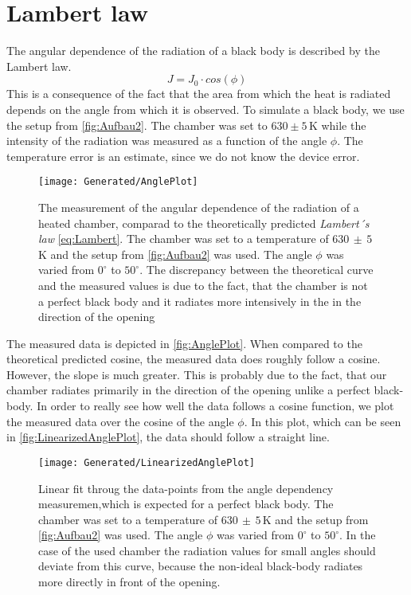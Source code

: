 \documentclass[a4paper,10pt,twocolumn]{article}
\begin{document}
    \section{Lambert law}\label{sec:lambertLaw}
    The angular dependence of the radiation of a black body is described by the Lambert law.
    \begin{equation}\label{eq:Lambert}
        J = J_0 \cdot cos(\phi)
    \end{equation}
    This is a consequence of the fact that the area from which the heat is radiated depends on the angle from which it is observed.
    To simulate a black body, we use the setup from \autoref{fig:Aufbau2}.
    The chamber was set to $630 \pm 5\,$K while the intensity of the radiation was measured as a function of the angle $\phi$.
    The temperature error is an estimate, since we do not know the device error.
    \begin{figure}
        \begin{center}
            \texttt{[image: Generated/AnglePlot]}
            \caption{The measurement of the angular dependence of the radiation of a heated chamber, comparad to the theoretically predicted \textit{Lambert´s law} \autoref{eq:Lambert}.
            The chamber was set to a temperature of $630\, \pm \,5\,$K and the setup from \autoref{fig:Aufbau2} was used.
            The angle $\phi$ was varied from $0^\circ$ to $50^\circ $.
            The discrepancy between the theoretical curve and the measured values is due to the fact, that the chamber is not a perfect black body and it radiates more intensively in the in the direction of the opening}
            \label{fig:AnglePlot}
        \end{center}
    \end{figure}
    The measured data is depicted in \autoref{fig:AnglePlot}.
    When compared to the theoretical predicted cosine, the measured data does roughly follow a cosine.
    However, the slope is much greater.
    This is probably due to the fact, that our chamber radiates primarily in the direction of the opening unlike a perfect black-body.
    In order to really see how well the data follows a cosine function, we plot the measured data over the cosine of the angle $\phi$.
    In this plot, which can be seen in \autoref{fig:LinearizedAnglePlot}, the data should follow a straight line.
    \begin{figure}
        \begin{center}
            \texttt{[image: Generated/LinearizedAnglePlot]}
            \caption{Linear fit throug the data-points from the angle dependency measuremen,which is expected for a perfect black body.
            The chamber was set to a temperature of $630\, \pm \,5\,$K and the setup from \autoref{fig:Aufbau2} was used.
            The angle $\phi$ was varied from $0^\circ$ to $50^\circ $.
            In the case of the used chamber the radiation values for small angles should deviate from this curve,
            because the non-ideal black-body radiates more directly in front of the opening.}
            \label{fig:LinearizedAnglePlot}
        \end{center}
    \end{figure}
\end{document}
